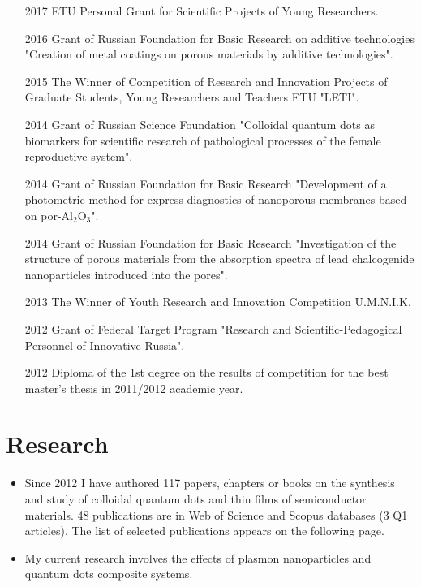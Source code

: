 \documentclass[a4paper,10pt]{article}
\begin{document}
\begin{enumerate}
\item[2017] ETU Personal Grant for Scientific Projects of Young Researchers.
\item[2016] Grant of Russian Foundation for Basic Research on additive technologies "Creation of metal coatings on porous materials by additive technologies".
\item[2015] The Winner of Competition of Research and Innovation Projects of Graduate Students, Young Researchers and Teachers ETU "LETI".
\item[2014] Grant of Russian Science Foundation "Colloidal quantum dots as biomarkers for scientific research of pathological processes of the female reproductive system".
\item[2014] Grant of Russian Foundation for Basic Research "Development of a photometric method for express diagnostics of nanoporous membranes based on por-Al$_2$O$_3$".
\item[2014] Grant of Russian Foundation for Basic Research "Investigation of the structure of porous materials from the absorption spectra of lead chalcogenide nanoparticles introduced into the pores".
\item[2013] The Winner of Youth Research and Innovation Competition U.M.N.I.K.
\item[2012] Grant of Federal Target Program "Research and Scientific-Pedagogical Personnel of Innovative Russia".
\item[2012] Diploma of the 1st degree on the results of competition for the best master's thesis in 2011/2012 academic year.

\end{enumerate}

\section{Research}

\begin{itemize}\parskip=0cm
\item Since 2012 I have authored 117 papers, chapters or books on the synthesis and study of colloidal quantum dots and thin films of semiconductor materials. 48 publications are in Web of Science and Scopus databases (3 Q1 articles). The list of selected publications appears on the following page.
\item My current research involves the effects of plasmon nanoparticles and quantum dots composite systems.
\end{itemize}


\nocite{*}
\printbibliography
\end{document}
